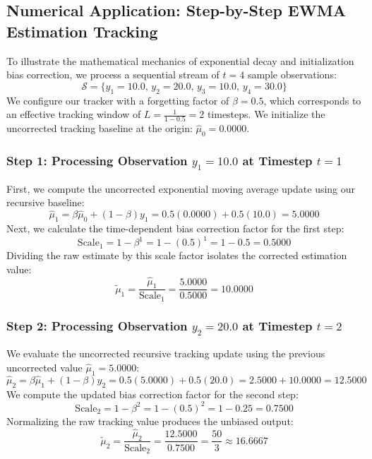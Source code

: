 \documentclass{article}
\begin{document}
\subsection{Numerical Application: Step-by-Step EWMA Estimation Tracking}

To illustrate the mathematical mechanics of exponential decay and initialization bias correction, we process a sequential stream of $t = 4$ sample observations:
\begin{equation}
\mathcal{S} = \{y_1 = 10.0, \, y_2 = 20.0, \, y_3 = 10.0, \, y_4 = 30.0\}
\end{equation}
We configure our tracker with a forgetting factor of $\beta = 0.5$, which corresponds to an effective tracking window of $L = \frac{1}{1-0.5} = 2$ timesteps. We initialize the uncorrected tracking baseline at the origin: $\hat{\mu}_0 = 0.0000$.

\subsubsection{Step 1: Processing Observation $y_1 = 10.0$ at Timestep $t = 1$}
First, we compute the uncorrected exponential moving average update using our recursive baseline:
\begin{equation}
\hat{\mu}_1 = \beta \hat{\mu}_0 + (1 - \beta) y_1 = 0.5(0.0000) + 0.5(10.0) = \mathbf{5.0000}
\end{equation}
Next, we calculate the time-dependent bias correction factor for the first step:
\begin{equation}
\text{Scale}_1 = 1 - \beta^1 = 1 - (0.5)^1 = 1 - 0.5 = \mathbf{0.5000}
\end{equation}
Dividing the raw estimate by this scale factor isolates the corrected estimation value:
\begin{equation}
\tilde{\mu}_1 = \frac{\hat{\mu}_1}{\text{Scale}_1} = \frac{5.0000}{0.5000} = \mathbf{10.0000}
\end{equation}

\subsubsection{Step 2: Processing Observation $y_2 = 20.0$ at Timestep $t = 2$}
We evaluate the uncorrected recursive tracking update using the previous uncorrected value $\hat{\mu}_1 = 5.0000$:
\begin{equation}
\hat{\mu}_2 = \beta \hat{\mu}_1 + (1 - \beta) y_2 = 0.5(5.0000) + 0.5(20.0) = 2.5000 + 10.0000 = \mathbf{12.5000}
\end{equation}
We compute the updated bias correction factor for the second step:
\begin{equation}
\text{Scale}_2 = 1 - \beta^2 = 1 - (0.5)^2 = 1 - 0.25 = \mathbf{0.7500}
\end{equation}
Normalizing the raw tracking value produces the unbiased output:
\begin{equation}
\tilde{\mu}_2 = \frac{\hat{\mu}_2}{\text{Scale}_2} = \frac{12.5000}{0.7500} = \frac{50}{3} \approx \mathbf{16.6667}
\end{equation}
\end{document}
